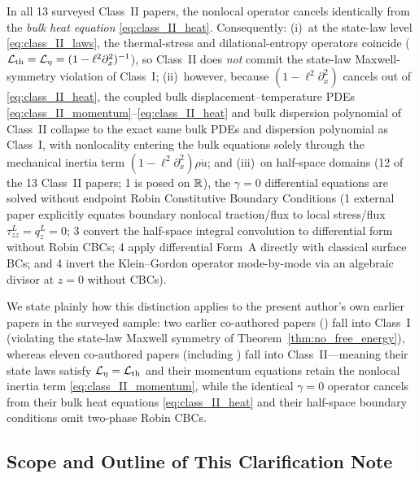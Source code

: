 \begin{itemize}[leftmargin=*]
  In all 13 surveyed Class~II papers, the nonlocal operator cancels identically from the \emph{bulk heat equation} \eqref{eq:class_II_heat}. Consequently: (i)~at the state-law level \eqref{eq:class_II_laws}, the thermal-stress and dilational-entropy operators coincide ($\mathcal{L}_{\mathrm{th}} = \mathcal{L}_\eta = (1-\ell^2\partial_x^2)^{-1}$), so Class~II does \emph{not} commit the state-law Maxwell-symmetry violation of Class~I; (ii)~however, because $(1-\ell^2\partial_x^2)$ cancels out of \eqref{eq:class_II_heat}, the coupled bulk displacement--temperature PDEs \eqref{eq:class_II_momentum}--\eqref{eq:class_II_heat} and bulk dispersion polynomial of Class~II collapse to the exact same bulk PDEs and dispersion polynomial as Class~I, with nonlocality entering the bulk equations solely through the mechanical inertia term $(1-\ell^2\partial_x^2)\rho\ddot{u}$; and (iii)~on half-space domains (12 of the 13 Class~II papers; 1 is posed on $\mathbb{R}$), the $\gamma=0$ differential equations are solved without endpoint Robin Constitutive Boundary Conditions (1 external paper explicitly equates boundary nonlocal traction/flux to local stress/flux $\tau_{zz}^L = q_z^L = 0$; 3 convert the half-space integral convolution to differential form without Robin CBCs; 4 apply differential Form~A directly with classical surface BCs; and 4 invert the Klein--Gordon operator mode-by-mode via an algebraic divisor at $z=0$ without CBCs).
\end{itemize}
We state plainly how this distinction applies to the present author's own earlier papers in the surveyed sample: two earlier co-authored papers (\cite{BarakGupta2023,GuptaKumar2023a}) fall into Class~I (violating the state-law Maxwell symmetry of Theorem~\ref{thm:no_free_energy}), whereas eleven co-authored papers (including \cite{GuptaBarakDas2023b,GuptaBarakDas2024b}) fall into Class~II---meaning their state laws satisfy $\mathcal{L}_\eta = \mathcal{L}_{\mathrm{th}}$ and their momentum equations retain the nonlocal inertia term \eqref{eq:class_II_momentum}, while the identical $\gamma=0$ operator cancels from their bulk heat equations \eqref{eq:class_II_heat} and their half-space boundary conditions omit two-phase Robin CBCs.

\subsection{Scope and Outline of This Clarification Note}\label{subsec:scope}

